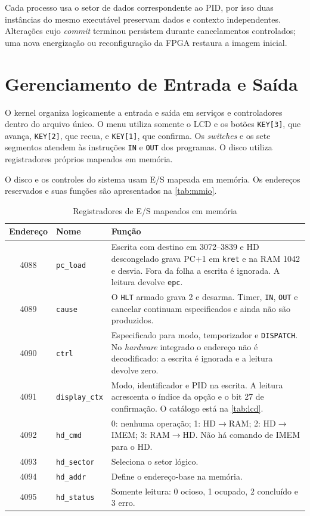 \documentclass[
    12pt,
    openright,
    a4paper,
    english,
    brazilian
]{abntex2}
\begin{document}
Cada processo usa o setor de dados correspondente ao PID, por isso duas instâncias do mesmo executável preservam dados e contexto independentes. Alterações cujo \emph{commit} terminou persistem durante cancelamentos controlados; uma nova energização ou reconfiguração da FPGA restaura a imagem inicial.

\section{Gerenciamento de Entrada e Saída}

O kernel organiza logicamente a entrada e saída em serviços e controladores dentro do arquivo único. O menu utiliza somente o LCD e os botões \texttt{KEY[3]}, que avança, \texttt{KEY[2]}, que recua, e \texttt{KEY[1]}, que confirma. Os \emph{switches} e os sete segmentos atendem às instruções \texttt{IN} e \texttt{OUT} dos programas. O disco utiliza registradores próprios mapeados em memória.

O disco e os controles do sistema usam E/S mapeada em memória. Os endereços reservados e suas funções são apresentados na \autoref{tab:mmio}.

\begin{table}[H]
\centering
\caption{Registradores de E/S mapeados em memória}
\label{tab:mmio}
\small
\begin{tabular}{clp{7.8cm}}
\toprule
\textbf{Endereço} & \textbf{Nome} & \textbf{Função} \\
\midrule
4088 & \texttt{pc\_load} & Escrita com destino em 3072--3839 e HD descongelado grava PC+1 em \texttt{kret} e na RAM 1042 e desvia. Fora da folha a escrita é ignorada. A leitura devolve \texttt{epc}. \\
4089 & \texttt{cause} & O \texttt{HLT} armado grava 2 e desarma. Timer, \texttt{IN}, \texttt{OUT} e cancelar continuam especificados e ainda não são produzidos. \\
4090 & \texttt{ctrl} & Especificado para modo, temporizador e \texttt{DISPATCH}. No \emph{hardware} integrado o endereço não é decodificado: a escrita é ignorada e a leitura devolve zero. \\
4091 & \texttt{display\_ctx} & Modo, identificador e PID na escrita. A leitura acrescenta o índice da opção e o bit 27 de confirmação. O catálogo está na \autoref{tab:lcd}. \\
4092 & \texttt{hd\_cmd} & 0: nenhuma operação; 1: HD$\rightarrow$RAM; 2: HD$\rightarrow$IMEM; 3: RAM$\rightarrow$HD. Não há comando de IMEM para o HD. \\
4093 & \texttt{hd\_sector} & Seleciona o setor lógico. \\
4094 & \texttt{hd\_addr} & Define o endereço-base na memória. \\
4095 & \texttt{hd\_status} & Somente leitura: 0 ocioso, 1 ocupado, 2 concluído e 3 erro. \\
\bottomrule
\end{tabular}
\end{table}
\end{document}
